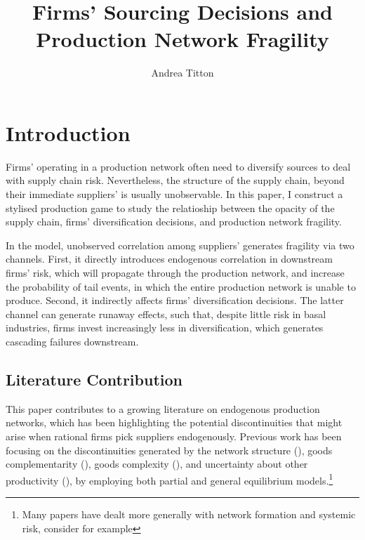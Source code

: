 \documentclass[american, abstract=on]{scrartcl}
\author{Andrea Titton}
\title{Firms' Sourcing Decisions and\\ Production Network Fragility}
\theoremstyle{plain}
\newcommand\notes[1]{\textcolor{teal}{\footnotesize \textbf{#1}}}
\begin{document}
\maketitle
\section{Introduction}

\iffalse
\notes{
  \begin{enumerate}
    \item Research question
    \item Contribution to the literature
    \item Why do we care?
  \end{enumerate}
}
\fi

Firms' operating in a production network often need to diversify sources to deal with supply chain risk. Nevertheless, the structure of the supply chain, beyond their immediate suppliers' is usually unobservable. In this paper, I construct a stylised production game to study the relatioship between the opacity of the supply chain, firms' diversification decisions, and production network fragility. 

In the model, unobserved correlation among suppliers' generates fragility via two channels. First, it directly introduces endogenous correlation in downstream firms' risk, which will propagate through the production network, and increase the probability of tail events, in which the entire production network is unable to produce. Second, it indirectly affects firms' diversification decisions. The latter channel can generate runaway effects, such that, despite little risk in basal industries, firms invest increasingly less in diversification, which generates cascading failures downstream.

\subsection{Literature Contribution}

This paper contributes to a growing literature on endogenous production networks, which has been highlighting the potential discontinuities that might arise when rational firms pick suppliers endogenously. Previous work has been focusing on the discontinuities generated by the network structure (\cite{baqaee_macroeconomic_2019}), goods complementarity (\cite{acemoglu_endogenous_2020}), goods complexity (\cite{elliott_supply_2022}), and uncertainty about other productivity (\cite{kopytov_endogenous_2021}), by employing both partial and general equilibrium models.\footnote{Many papers have dealt more generally with network formation and systemic risk, consider for example }
\end{document}
